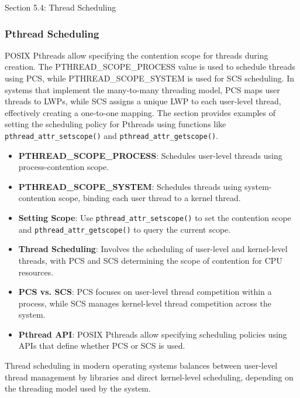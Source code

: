 \begin{notes}{Section 5.4: Thread Scheduling}
\begin{highlight}
    \end{highlight}
    
    \subsubsection*{Pthread Scheduling}
    
    POSIX Pthreads allow specifying the contention scope for threads during creation. The PTHREAD\_SCOPE\_PROCESS value is used to schedule threads using PCS, while PTHREAD\_SCOPE\_SYSTEM is used for SCS 
    scheduling. In systems that implement the many-to-many threading model, PCS maps user threads to LWPs, while SCS assigns a unique LWP to each user-level thread, effectively creating a one-to-one 
    mapping. The section provides examples of setting the scheduling policy for Pthreads using functions like \texttt{pthread\_attr\_setscope()} and \texttt{pthread\_attr\_getscope()}.
    
    \begin{highlight}
    
        \begin{itemize}
            \item \textbf{PTHREAD\_SCOPE\_PROCESS}: Schedules user-level threads using process-contention scope.
            \item \textbf{PTHREAD\_SCOPE\_SYSTEM}: Schedules threads using system-contention scope, binding each user thread to a kernel thread.
            \item \textbf{Setting Scope}: Use \texttt{pthread\_attr\_setscope()} to set the contention scope and \texttt{pthread\_attr\_getscope()} to query the current scope.
        \end{itemize}
    
    \end{highlight}
    
    \begin{highlight}
    
        \begin{itemize}
            \item \textbf{Thread Scheduling}: Involves the scheduling of user-level and kernel-level threads, with PCS and SCS determining the scope of contention for CPU resources.
            \item \textbf{PCS vs. SCS}: PCS focuses on user-level thread competition within a process, while SCS manages kernel-level thread competition across the system.
            \item \textbf{Pthread API}: POSIX Pthreads allow specifying scheduling policies using APIs that define whether PCS or SCS is used.
        \end{itemize}
    
    Thread scheduling in modern operating systems balances between user-level thread management by libraries and direct kernel-level scheduling, depending on the threading model used by the system.
    
    \end{highlight}
\end{notes}

